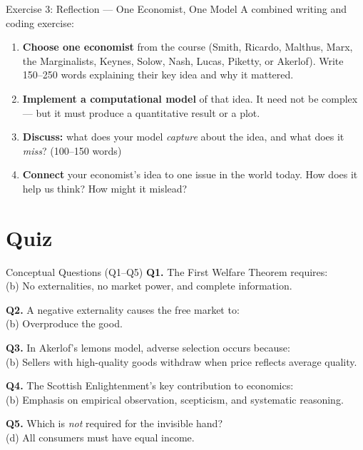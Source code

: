 \documentclass[aspectratio=169, 10pt]{beamer}
\begin{document}
\begin{frame}{Exercise 3: Reflection --- One Economist, One Model}
A combined writing and coding exercise:
\vspace{0.5em}
\begin{enumerate}
  \item[(a)] \textbf{Choose one economist} from the course (Smith, Ricardo,
        Malthus, Marx, the Marginalists, Keynes, Solow, Nash, Lucas,
        Piketty, or Akerlof). Write 150--250 words explaining their
        key idea and why it mattered.
  \item[(b)] \textbf{Implement a computational model} of that idea.
        It need not be complex --- but it must produce a quantitative
        result or a plot.
  \item[(c)] \textbf{Discuss:} what does your model \textit{capture}
        about the idea, and what does it \textit{miss}? (100--150 words)
  \item[(d)] \textbf{Connect} your economist's idea to one issue in the
        world today. How does it help us think? How might it mislead?
\end{enumerate}
\end{frame}

\section{Quiz}

\begin{frame}{Conceptual Questions (Q1--Q5)}
\textbf{Q1.} The First Welfare Theorem requires:\\
\quad (b) No externalities, no market power, and complete information.
\vspace{0.3em}

\textbf{Q2.} A negative externality causes the free market to:\\
\quad (b) Overproduce the good.
\vspace{0.3em}

\textbf{Q3.} In Akerlof's lemons model, adverse selection occurs because:\\
\quad (b) Sellers with high-quality goods withdraw when price reflects
average quality.
\vspace{0.3em}

\textbf{Q4.} The Scottish Enlightenment's key contribution to economics:\\
\quad (b) Emphasis on empirical observation, scepticism, and systematic
reasoning.
\vspace{0.3em}

\textbf{Q5.} Which is \textit{not} required for the invisible hand?\\
\quad (d) All consumers must have equal income.
\end{frame}
\end{document}
